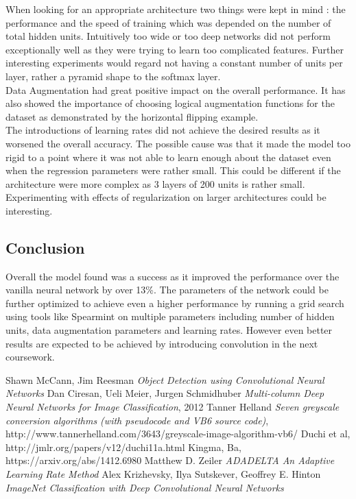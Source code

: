\documentclass[12pt]{article}
\begin{document}
When looking for an appropriate architecture two things were kept in mind : the performance and the speed of training which was depended on the number of total hidden units. Intuitively too wide or too deep networks did not perform exceptionally well as they were trying to learn too complicated features. Further interesting experiments would regard not having a constant number of units per layer, rather a pyramid shape to the softmax layer.
\\


Data Augmentation had great positive impact on the overall performance. It has also showed the importance of choosing logical augmentation functions for the dataset as demonstrated by the horizontal flipping example.
\\

The introductions of learning rates did not achieve the desired results as it worsened the overall accuracy. The possible cause was that it made the model too rigid to a point where it was not able to learn enough about the dataset even when the regression parameters were rather small. This could be different if the architecture were more complex as 3 layers of 200 units is rather small. Experimenting with effects of regularization on larger architectures could be interesting.




\subsection*{Conclusion}

Overall the model found was a success as it improved the performance over the vanilla neural network by over 13\%. The parameters of the network could be further optimized to achieve even a higher performance by running a grid search using tools like Spearmint on multiple parameters including number of hidden units, data augmentation parameters and learning rates. However even better results are expected to be achieved by introducing convolution in the next coursework.



\begin{thebibliography}{1}
 Shawn McCann, Jim Reesman {\em Object Detection using Convolutional Neural Networks} 
 Dan Ciresan, Ueli Meier, Jurgen Schmidhuber {\em Multi-column Deep Neural Networks for Image Classification}, 2012
 Tanner Helland {\em Seven greyscale conversion algorithms (with pseudocode and VB6 source code)}, http://www.tannerhelland.com/3643/greyscale-image-algorithm-vb6/
 Duchi et al, http://jmlr.org/papers/v12/duchi11a.html
 Kingma, Ba, https://arxiv.org/abs/1412.6980
 Matthew D. Zeiler {\em ADADELTA An Adaptive Learning Rate Method}
 Alex Krizhevsky, Ilya Sutskever, Geoffrey E. Hinton {\em ImageNet Classification with Deep Convolutional Neural Networks}


\end{thebibliography}
\end{document}
